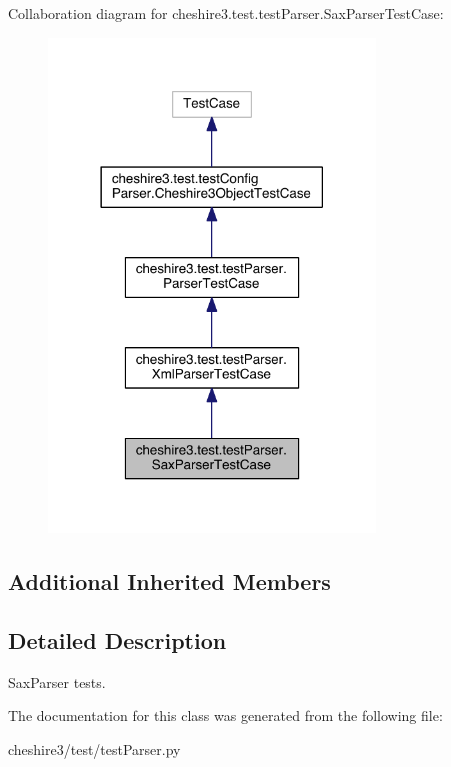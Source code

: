 Collaboration diagram for cheshire3.\-test.\-test\-Parser.\-Sax\-Parser\-Test\-Case\-:
\nopagebreak
\begin{figure}[H]
\begin{center}
\leavevmode
\includegraphics[width=246pt]{classcheshire3_1_1test_1_1test_parser_1_1_sax_parser_test_case__coll__graph}
\end{center}
\end{figure}
\subsection*{Additional Inherited Members}


\subsection{Detailed Description}
\begin{DoxyVerb}SaxParser tests.\end{DoxyVerb}
 

The documentation for this class was generated from the following file\-:\begin{DoxyCompactItemize}
\item 
cheshire3/test/test\-Parser.\-py\end{DoxyCompactItemize}
